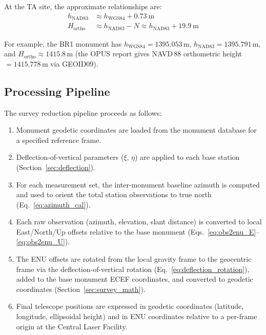 \documentclass[11pt,letterpaper]{article}
\begin{document}
\noindent At the TA site, the approximate relationships are:
\begin{align}
h_{\text{NAD83}} &\approx h_{\text{WGS84}} + 0.73~\text{m} \label{eq:nad83_wgs84}\\
H_{\text{ortho}} &\approx h_{\text{NAD83}} - N \approx h_{\text{NAD83}} + 19.9~\text{m} \label{eq:ortho}
\end{align}

\noindent For example, the BR1 monument has $h_{\text{WGS84}} = 1395.053$\,m, $h_{\text{NAD83}} = 1395.791$\,m, and $H_{\text{ortho}} \approx 1415.8$\,m (the OPUS report gives NAVD\,88 orthometric height $= 1415.778$\,m via GEOID09).



\subsection{Processing Pipeline}
\label{sec:pipeline}

The survey reduction pipeline proceeds as follows:

\begin{enumerate}[nosep]
    \item Monument geodetic coordinates are loaded from the monument database for a specified reference frame.
    \item Deflection-of-vertical parameters ($\xi$, $\eta$) are applied to each base station (Section~\ref{sec:deflection}).
    \item For each measurement set, the inter-monument baseline azimuth is computed and used to orient the total station observations to true north (Eq.~\ref{eq:azimuth_cal}).
    \item Each raw observation (azimuth, elevation, slant distance) is converted to local East/North/Up offsets relative to the base monument (Eqs.~\ref{eq:obs2enu_E}--\ref{eq:obs2enu_U}).
    \item The ENU offsets are rotated from the local gravity frame to the geocentric frame via the deflection-of-vertical rotation (Eq.~\ref{eq:deflection_rotation}), added to the base monument ECEF coordinates, and converted to geodetic coordinates (Section~\ref{sec:survey_math}).
    \item Final telescope positions are expressed in geodetic coordinates (latitude, longitude, ellipsoidal height) and in ENU coordinates relative to a per-frame origin at the Central Laser Facility.
\end{enumerate}
\end{document}

